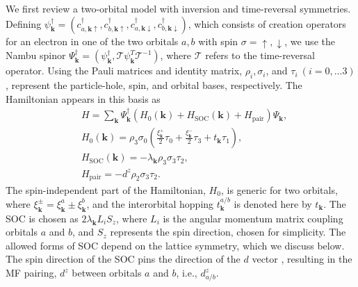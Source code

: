 \documentclass[%
reprint,
superscriptaddress,
 amsmath,amssymb,
 aps,
prb,
nobalancelastpage,
]{revtex4-2}
\begin{document}
We first review a two-orbital model with inversion and time-reversal symmetries. Defining $\psi_{\textbf{k}}^{\dagger} = (c^{\dagger}_{a,\textbf{k}\uparrow}, c^{\dagger}_{b,\textbf{k}\uparrow}, c^{\dagger}_{a,\textbf{k}\downarrow}, c^{\dagger}_{b,\textbf{k}\downarrow})$, which consists of creation operators for an electron in one of the two orbitals $a,b$ with spin $\sigma=\uparrow,\downarrow$, we use the Nambu spinor $\Psi_{\textbf{k}}^{\dagger} = (\psi_{\textbf{k}}^{\dagger}, \mathcal{T}\psi_{\textbf{k}}^{T}\mathcal{T}^{-1})$, where $\mathcal{T}$ refers to the time-reversal operator. Using the Pauli matrices and identity matrix, $\rho_{i},\sigma_{i}$, and $\tau_{i}~(i = 0,...3)$, represent the particle-hole, spin, and orbital bases, respectively. The Hamiltonian appears in this basis as
\begin{equation}
\begin{aligned}
    &H =\sum_{\textbf{k}} \Psi_{\textbf{k}}^{\dagger}(H_{0}(\textbf{k})+H_{\text{SOC}}(\textbf{k})+H_{\text{pair}})\Psi_{\textbf{k}}, \\
    &H_{0}(\textbf{k}) = \rho_{3}\sigma_{0}\left(\frac{\xi_{\textbf{k}}^{+}}{2}\tau_{0} + \frac{\xi_{\textbf{k}}^{-}}{2}\tau_{3} + t_{\textbf{k}}\tau_{1}\right),\\[6pt]
    &H_{\text{SOC}}(\textbf{k})=-\lambda_{\textbf{k}}\rho_{3}\sigma_{3}\tau_{2},\\[6pt]
    &H_\text{pair} = -d^{z} \rho_{2}\sigma_{3}\tau_{2}.
\end{aligned}
\end{equation}
The spin-independent part of the Hamiltonian, $H_{0}$, is generic for two orbitals, where $\xi_{\textbf{k}}^{\pm} = \xi_{\textbf{k}}^{a} \pm \xi_{\textbf{k}}^{b}$, and the interorbital hopping $t_{\textbf{k}}^{a/b}$ is denoted here by $t_{\textbf{k}}$. The SOC is chosen as $2\lambda_{\textbf{k}}L_{i}S_{z}$, where $L_{i}$ is the angular momentum matrix coupling orbitals $a$ and $b$, and $S_{z}$ represents the spin direction, chosen for simplicity. The allowed forms of SOC depend on the lattice symmetry, which we discuss below. The spin direction of the SOC pins the direction of the $d$ vector \cite{Puetter2012EPL, vafek2017hund}, resulting in the MF pairing, $d^{z}$ between orbitals $a$ and $b$, i.e., $d^{z}_{a/b}$.
\end{document}
